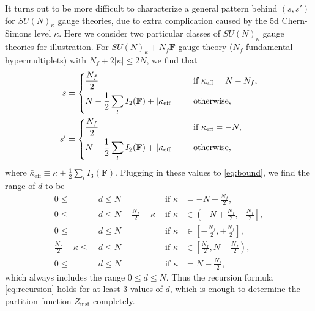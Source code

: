 \documentclass[letterpaper, 11pt]{article}
\newcommand{\nn}{\nonumber}
\def\k{\kappa}
\def\half{\frac{1}{2}}
\begin{document}
{It turns out to be more difficult to characterize a general pattern behind $(s, s')$ for $SU(N)_\kappa$ gauge theories, due to extra complication caused by the 5d Chern-Simons level $\kappa$. Here we consider two particular classes of $SU(N)_\kappa$ gauge theories for illustration.  For $SU(N)_\kappa + N_f\mathbf{F}$ gauge theory ($N_f$ fundamental hypermultiplets) with $N_f + 2|\kappa| \leq 2N$, we find that 
\begin{align}
  \label{eq:sun-nf}
  s &= \begin{dcases}
   \frac{N_f}{2}
  &  \quad \text{ if }  \kappa_\text{eff} = N - N_f, \\
  N - \frac{1}{2} \sum_{l}I_2(\mathbf{F}) + |\k_\text{eff}| 
  &  \quad  \textstyle\text{ otherwise},
  \end{dcases}\\
  s' &=
    \begin{dcases}
      \frac{N_f}{2}
     & \quad \textstyle\text{ if }  \kappa_\text{eff} = -N, \\
     N - \frac{1}{2} \sum_{l}I_2(\mathbf{F}) + \left|\bar{\k}_\text{eff}\right| 
     & \quad \textstyle\text{ otherwise} ,
    \end{dcases}  
\end{align}
where $\bar{\k}_\text{eff} \equiv \k + \half \sum_l I_3 (\mathbf{F}) $. 
Plugging in these values to \eqref{eq:bound}, we find the range of $d$ to be
\begin{align}
  \label{eq:sun-nf-range}
  0 \leq &\ d \leq N &\text{ if } \kappa &= -N + \frac{N_f}{2}, \nn \\
  0 \leq &\ d \leq N-\frac{N_f}{2}-\kappa &\text{ if } \kappa & \in \left(-N +\frac{N_f}{2}, -\frac{N_f}{2} \right], \nn \\
  0 \leq &\ d \leq N &\text{ if } \kappa &\in \left[-\frac{N_f}{2}, +\frac{N_f}{2}\right], \\
  \frac{N_f}{2}-\kappa \leq &\ d \leq N & \text{ if } \kappa &\in \left[\frac{N_f}{2}, N -\frac{N_f}{2}\right),  \nn \\
  0 \leq &\ d \leq N & \text{ if } \kappa &= N -\frac{N_f}{2},  \nn 
\end{align}
which always includes the range $0 \leq d \leq N$. Thus the recursion formula \eqref{eq:recursion} holds for at least $3$ values of $d$, which is enough to determine the partition function $Z_{\text{inst}}$ completely.

}
\end{document}
